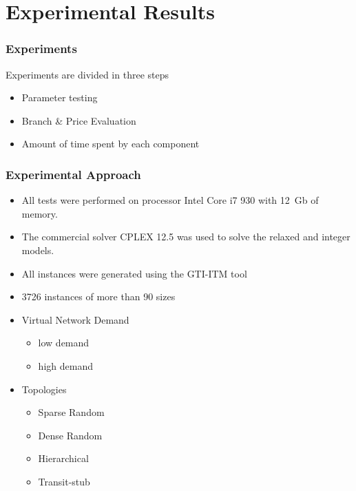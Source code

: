 \documentclass[english]{beamer}
\begin{document}
\section{Experimental Results}

\begin{frame}
\frametitle{Experiments}
Experiments are divided in three steps
\begin{itemize}
  \item Parameter testing
  \item Branch \& Price Evaluation
  \item Amount of time spent by each component
\end{itemize}
\end{frame}
\begin{frame}
\frametitle{Experimental Approach}
\begin{itemize}
  \item All tests were performed on processor Intel Core i7 930 with 12~Gb of memory. 
  \item The commercial solver CPLEX 12.5 was used to solve the relaxed and integer models. 
  \item All instances were generated using the GTI-ITM tool
  \item 3726 instances of more than 90 sizes
  \item Virtual Network Demand
    \begin{itemize}
      \item low demand 
      \item high demand
    \end{itemize}
  \item Topologies
    \begin{itemize}
      \item Sparse Random
      \item Dense Random
      \item Hierarchical
      \item Transit-stub
    \end{itemize}
\end{itemize}
\end{frame}
\end{document}
